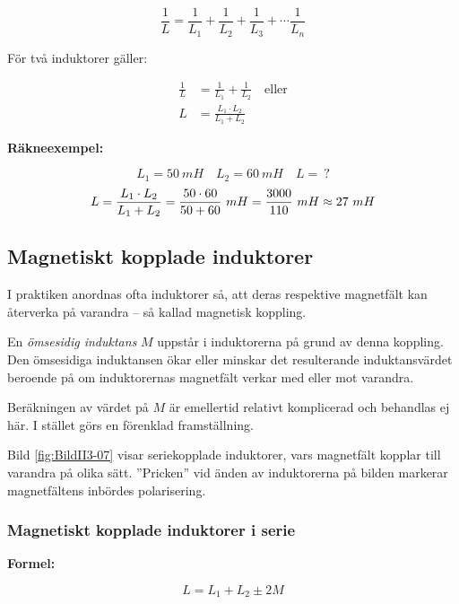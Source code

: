 \[
\frac{1}{L} = \frac{1}{L_1} + \frac{1}{L_2} + \frac{1}{L_3} +
\cdots \frac{1}{L_n}
\]

För två induktorer gäller:

\begin{align*}
  \frac{1}{L} &= \frac{1}{L_1} + \frac{1}{L_2} \quad \text{eller} \\
  L &= \frac{L_1 \cdot L_2}{L_1 + L_2}
\end{align*}

\textbf{Räkneexempel:}

\[L_1 = 50\ mH \quad L_2 = 60\ mH \quad L =\ ?\]
\[
  L = \frac{L_1 \cdot L_2}{L_1 + L_2} \\
  = \frac{50 \cdot 60}{50 + 60}\ mH \\
  = \frac{3000}{110}\ mH \\
  \approx 27\ mH
\]

\subsection{Magnetiskt kopplade induktorer}


I praktiken anordnas ofta induktorer så, att deras respektive magnetfält kan
återverka på varandra -- så kallad magnetisk koppling.

En \emph{ömsesidig induktans} \(M\) uppstår i induktorerna på grund av denna
koppling.
Den ömsesidiga induktansen ökar eller minskar det resulterande induktansvärdet
beroende på om induktorernas magnetfält verkar med eller mot varandra.

Beräkningen av värdet på \(M\) är emellertid relativt komplicerad och behandlas
ej här.
I stället görs en förenklad framställning.

Bild \ref{fig:BildII3-07} visar seriekopplade induktorer, vars magnetfält
kopplar till varandra på olika sätt.
''Pricken'' vid änden av induktorerna på bilden markerar magnetfältens inbördes polarisering.

\subsubsection{Magnetiskt kopplade induktorer i serie}

\textbf{Formel:}

\[L = L_1 +L_2 \pm 2M\]

